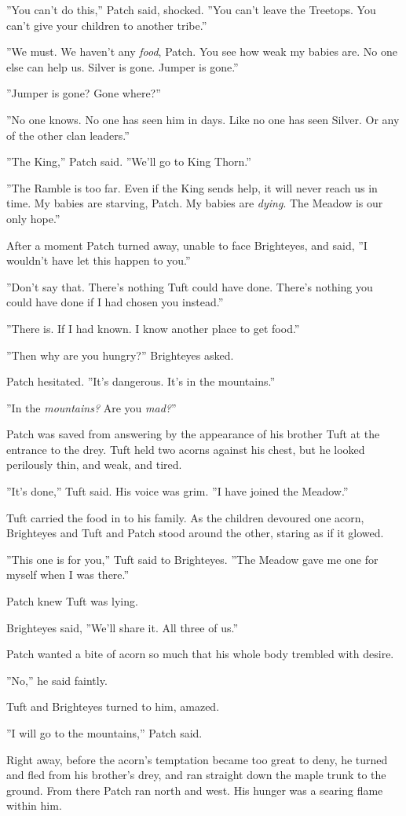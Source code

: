 \documentclass[12pt]{book}
\begin{document}
 ''You can't do this,'' Patch said, shocked. ''You can't leave the Treetops. You can't give your children to another tribe.''\par
 ''We must. We haven't any {\it food}, Patch. You see how weak my babies are. No one else can help us. Silver is gone. Jumper is gone.''\par
 ''Jumper is gone? Gone where?''\par
 ''No one knows. No one has seen him in days. Like no one has seen Silver. Or any of the other clan leaders.''\par
 ''The King,'' Patch said. ''We'll go to King Thorn.''\par
 ''The Ramble is too far. Even if the King sends help, it will never reach us in time. My babies are starving, Patch. My babies are {\it dying}. The Meadow is our only hope.''\par
 After a moment Patch turned away, unable to face Brighteyes, and said, ''I wouldn't have let this happen to you.''\par
 ''Don't say that. There's nothing Tuft could have done. There's nothing you could have done if I had chosen you instead.''\par
 ''There is. If I had known. I know another place to get food.''\par
 ''Then why are you hungry?'' Brighteyes asked.\par
 Patch hesitated. ''It's dangerous. It's in the mountains.''\par
 ''In the {\it mountains?} Are you {\it mad?}''\par
 Patch was saved from answering by the appearance of his brother Tuft at the entrance to the drey. Tuft held two acorns against his chest, but he looked perilously thin, and weak, and tired.\par
 ''It's done,'' Tuft said. His voice was grim. ''I have joined the Meadow.''\par
Tuft carried the food in to his family. As the children devoured one acorn, Brighteyes and Tuft and Patch stood around the other, staring as if it glowed.\par
 ''This one is for you,'' Tuft said to Brighteyes. ''The Meadow gave me one for myself when I was there.''\par
Patch knew Tuft was lying.\par
 Brighteyes said, ''We'll share it. All three of us.''\par
 Patch wanted a bite of acorn so much that his whole body trembled with desire.\par
''No,'' he said faintly.\par
 Tuft and Brighteyes turned to him, amazed.\par
 ''I will go to the mountains,'' Patch said.\par
Right away, before the acorn's temptation became too great to deny, he turned and fled from his brother's drey, and ran straight down the maple trunk to the ground. From there Patch ran north and west. His hunger was a searing flame within him.\par
\end{document}
